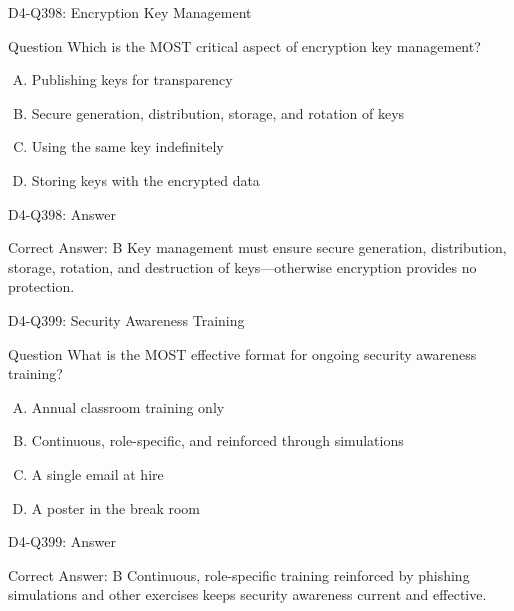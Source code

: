 \documentclass{beamer}
\begin{document}
\begin{frame}{D4-Q398: Encryption Key Management}
	\begin{block}{Question}
		Which is the MOST critical aspect of encryption key management?
	\end{block}
	\begin{enumerate}[(A)]
		\item Publishing keys for transparency
		\item Secure generation, distribution, storage, and rotation of keys
		\item Using the same key indefinitely
		\item Storing keys with the encrypted data
	\end{enumerate}
\end{frame}
\begin{frame}{D4-Q398: Answer}
	\begin{block}{Correct Answer: B}
		Key management must ensure secure generation, distribution, storage, rotation, and destruction of keys—otherwise encryption provides no protection.
	\end{block}
\end{frame}

\begin{frame}{D4-Q399: Security Awareness Training}
	\begin{block}{Question}
		What is the MOST effective format for ongoing security awareness training?
	\end{block}
	\begin{enumerate}[(A)]
		\item Annual classroom training only
		\item Continuous, role-specific, and reinforced through simulations
		\item A single email at hire
		\item A poster in the break room
	\end{enumerate}
\end{frame}
\begin{frame}{D4-Q399: Answer}
	\begin{block}{Correct Answer: B}
		Continuous, role-specific training reinforced by phishing simulations and other exercises keeps security awareness current and effective.
	\end{block}
\end{frame}
\end{document}
